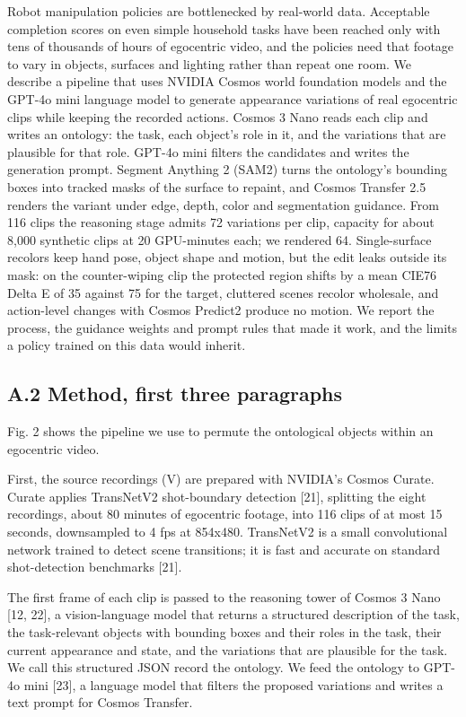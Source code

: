 \documentclass[
  11pt,
]{article}
\begin{document}
Robot manipulation policies are bottlenecked by real-world data.
Acceptable completion scores on even simple household tasks have been
reached only with tens of thousands of hours of egocentric video, and
the policies need that footage to vary in objects, surfaces and lighting
rather than repeat one room. We describe a pipeline that uses NVIDIA
Cosmos world foundation models and the GPT-4o mini language model to
generate appearance variations of real egocentric clips while keeping
the recorded actions. Cosmos 3 Nano reads each clip and writes an
ontology: the task, each object's role in it, and the variations that
are plausible for that role. GPT-4o mini filters the candidates and
writes the generation prompt. Segment Anything 2 (SAM2) turns the
ontology's bounding boxes into tracked masks of the surface to repaint,
and Cosmos Transfer 2.5 renders the variant under edge, depth, color and
segmentation guidance. From 116 clips the reasoning stage admits 72
variations per clip, capacity for about 8,000 synthetic clips at 20
GPU-minutes each; we rendered 64. Single-surface recolors keep hand
pose, object shape and motion, but the edit leaks outside its mask: on
the counter-wiping clip the protected region shifts by a mean CIE76
Delta E of 35 against 75 for the target, cluttered scenes recolor
wholesale, and action-level changes with Cosmos Predict2 produce no
motion. We report the process, the guidance weights and prompt rules
that made it work, and the limits a policy trained on this data would
inherit.

\subsection{A.2 Method, first three
paragraphs}\label{a.2-method-first-three-paragraphs}

Fig. 2 shows the pipeline we use to permute the ontological objects
within an egocentric video.

First, the source recordings (V) are prepared with NVIDIA's Cosmos
Curate. Curate applies TransNetV2 shot-boundary detection {[}21{]},
splitting the eight recordings, about 80 minutes of egocentric footage,
into 116 clips of at most 15 seconds, downsampled to 4 fps at 854x480.
TransNetV2 is a small convolutional network trained to detect scene
transitions; it is fast and accurate on standard shot-detection
benchmarks {[}21{]}.

The first frame of each clip is passed to the reasoning tower of Cosmos
3 Nano {[}12, 22{]}, a vision-language model that returns a structured
description of the task, the task-relevant objects with bounding boxes
and their roles in the task, their current appearance and state, and the
variations that are plausible for the task. We call this structured JSON
record the ontology. We feed the ontology to GPT-4o mini {[}23{]}, a
language model that filters the proposed variations and writes a text
prompt for Cosmos Transfer.
\end{document}
